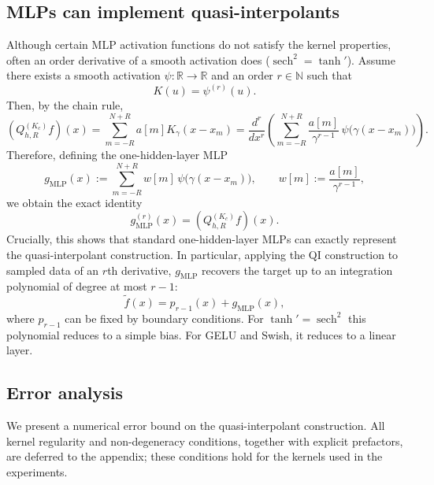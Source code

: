 \documentclass[11pt]{article}
\newcommand{\R}{\mathbb{R}}
\newcommand{\N}{\mathbb{N}}
\newcommand{\sech}{\operatorname{sech}}
\begin{document}
\subsection{MLPs can implement quasi-interpolants}
Although certain MLP activation functions do not satisfy the kernel properties, often an order derivative of a smooth activation does ($\sech^2 = \tanh'$). Assume there exists a smooth activation $\psi:\R\to\R$ and an order $r\in\N$ such that
\begin{equation}
K(u)=\psi^{(r)}(u).
\label{eq:kernel-derivative}
\end{equation}
Then, by the chain rule,
\begin{equation}
(Q_{h,R}^{(K_c)}f)(x)
= \sum_{m=-R}^{N+R} a[m]K_\gamma(x-x_m)
= \frac{d^r}{dx^r}
\left(\sum_{m=-R}^{N+R} \frac{a[m]}{\gamma^{r-1}} \, \psi\big(\gamma(x-x_m)\big)\right).
\label{eq:chain-rule-realization}
\end{equation}
Therefore, defining the one-hidden-layer MLP
\begin{equation}
g_{\mathrm{MLP}}(x):=\sum_{m=-R}^{N+R} w[m] \, \psi\big(\gamma(x-x_m)\big),
\qquad w[m]:=\frac{a[m]}{\gamma^{r-1}},
\label{eq:mlp-def}
\end{equation}
we obtain the exact identity
\begin{equation}
g_{\mathrm{MLP}}^{(r)}(x)=(Q_{h,R}^{(K_c)}f)(x).
\label{eq:exact-identity}
\end{equation}
Crucially, this shows that standard one-hidden-layer MLPs can exactly represent the quasi-interpolant construction. In particular, applying the QI construction to sampled data of an $r$th derivative, $g_{\mathrm{MLP}}$ recovers the target up to an integration polynomial of degree at most $r-1$:
\begin{equation}
\tilde f(x)=p_{r-1}(x)+g_{\mathrm{MLP}}(x),
\label{eq:integration-poly}
\end{equation}
where $p_{r-1}$ can be fixed by boundary conditions. For $\tanh'=\sech^2$ this polynomial reduces to a simple bias. For GELU and Swish, it reduces to a linear layer.

\subsection{Error analysis}
We present a numerical error bound on the quasi-interpolant construction. All kernel regularity and non-degeneracy conditions, together with explicit prefactors, are deferred to the appendix; these conditions hold for the kernels used in the experiments.
\end{document}
